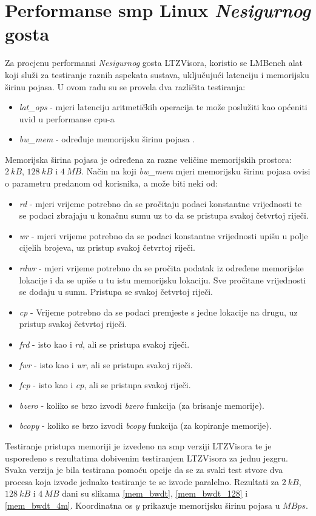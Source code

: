 \documentclass[times, utf8, diplomski, numeric]{fer}
\begin{document}
\section{Performanse \gls{smp} Linux \textit{Nesigurnog} gosta}
Za procjenu performansi \textit{Nesigurnog} gosta LTZVisora, koristio se LMBench alat koji služi za testiranje raznih
aspekata sustava, uključujući latenciju i memorijsku širinu pojasa. U ovom radu su se provela dva različita testiranja:
\begin{itemize}
  \item {\textit{lat\_ops} - mjeri latenciju aritmetičkih operacija te može poslužiti kao općeniti uvid u
  performanse \gls{cpu}-a}
  \item{\textit{bw\_mem} - određuje memorijsku širinu pojasa .}
\end{itemize}
Memorijska širina pojasa je određena za razne veličine memorijskih prostora: $2~kB$, $128~kB$ i $4~MB$.
Način na koji \textit{bw\_mem} mjeri memorijsku širinu pojasa ovisi o parametru predanom od korisnika, a može biti
neki od:
\begin{itemize}
  \item{\textit{rd} - mjeri vrijeme potrebno da se pročitaju podaci konstantne vrijednosti te se podaci zbrajaju u
  konačnu sumu uz to da se pristupa svakoj četvrtoj riječi.}
  \item{\textit{wr} - mjeri vrijeme potrebno da se podaci konstantne vrijednosti upišu u polje cijelih brojeva,
  uz pristup svakoj četvrtoj riječi.}
  \item{\textit{rdwr} - mjeri vrijeme potrebno da se pročita podatak iz određene memorijske lokacije i da se upiše
  u tu istu memorijsku lokaciju. Sve pročitane vrijednosti se dodaju u sumu. Pristupa se svakoj četvrtoj riječi.}
  \item{\textit{cp} - Vrijeme potrebno da se podaci premjeste s jedne lokacije na drugu, uz pristup svakoj četvrtoj riječi.}
  \item{\textit{frd} - isto kao i \textit{rd}, ali se pristupa svakoj riječi.}
  \item{\textit{fwr} - isto kao i \textit{wr}, ali se pristupa svakoj riječi.}
  \item{\textit{fcp} - isto kao i \textit{cp}, ali se pristupa svakoj riječi.}
  \item{\textit{bzero} - koliko se brzo izvodi \textit{bzero} funkcija (za brisanje memorije).}
  \item{\textit{bcopy} - koliko se brzo izvodi \textit{bcopy} funkcija (za kopiranje memorije).}
\end{itemize}
Testiranje pristupa memoriji je izvedeno na \gls{smp} verziji LTZVisora te je uspoređeno s rezultatima dobivenim testiranjem
LTZVisora za jednu jezgru. Svaka verzija je bila testirana pomoću opcije da se za svaki test stvore dva procesa koja
izvode jednako testiranje te se izvode paralelno. Rezultati za $2~kB$, $128~kB$ i $4~MB$ dani su slikama \ref{mem_bwdt},
\ref{mem_bwdt_128} i \ref{mem_bwdt_4m}. Koordinatna os $y$ prikazuje memorijsku širinu pojasa u $MBps$.
\end{document}
